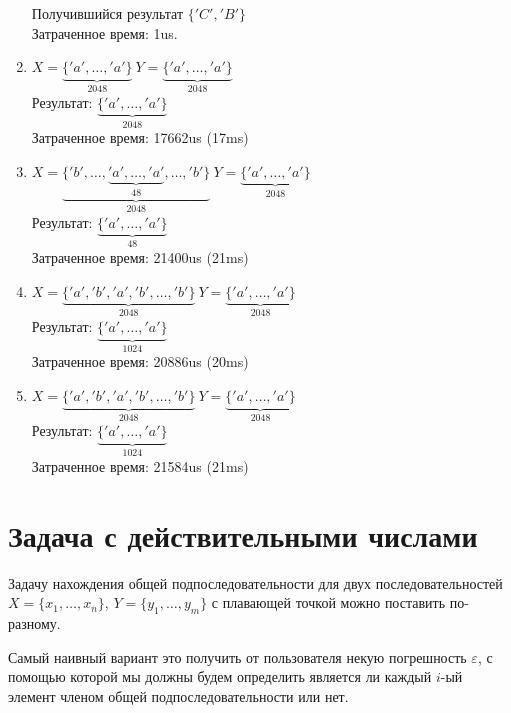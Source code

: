 \documentclass[12pt]{article}
\begin{document}
\begin{enumerate}
        Получившийся результат $ \{'C', 'B'\}$ \\
        Затраченное время: 1us.
    \item $X = \underbrace{\{'a', \ldots, 'a'\}}_{2048}\ Y = \underbrace{\{'a', \ldots, 'a'\}}_{2048}$ \\
        Результат: $\underbrace{\{'a', \ldots, 'a'\}}_{2048}$ \\
        Затраченное время: 17662us (17ms)
    \item $X = \underbrace{\{'b', \ldots, \underbrace{'a', \ldots, 'a'}_{48}, \ldots, 'b'\}}_{2048}\ Y = \underbrace{\{'a', \ldots, 'a'\}}_{2048}$ \\
        Результат: $\underbrace{\{'a', \ldots, 'a'\}}_{48}$ \\
        Затраченное время: 21400us (21ms)
    \item $X = \underbrace{\{'a', 'b', 'a', 'b',   \ldots, 'b'\}}_{2048}\ Y = \underbrace{\{'a', \ldots, 'a'\}}_{2048}$ \\
        Результат: $\underbrace{\{'a', \ldots, 'a'\}}_{1024}$ \\
        Затраченное время: 20886us (20ms)
    \item $X = \underbrace{\{'a', 'b', 'a', 'b',   \ldots, 'b'\}}_{2048}\ Y = \underbrace{\{'a', \ldots, 'a'\}}_{2048}$ \\
        Результат: $\underbrace{\{'a', \ldots, 'a'\}}_{1024}$ \\
        Затраченное время: 21584us (21ms)



\end{enumerate}

\newpage

\section{Задача с действительными числами}

Задачу нахождения общей подпоследовательности для двух последовательностей \\
$X = \{x_1, \ldots, x_n\}$, $Y = \{y_1, \ldots, y_m\}$ с плавающей точкой можно поставить по-разному.

Самый наивный вариант это получить от пользователя
некую погрешность $\varepsilon$, с помощью которой мы
должны будем определить является ли каждый $i$-ый
элемент членом общей подпоследовательности или нет.
\end{document}
